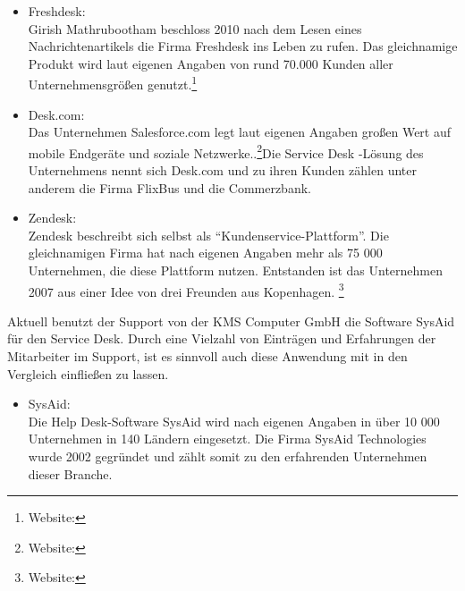 \begin{itemize}
\item Freshdesk:\\
		Girish Mathrubootham beschloss 2010 nach dem Lesen eines Nachrichtenartikels die Firma 
		Freshdesk ins Leben zu rufen. Das gleichnamige Produkt wird laut eigenen Angaben von rund 
		70.000 Kunden aller Unternehmensgrößen genutzt.\footnote{Website:\cite{Freshdesk}}
		\\
		 
\item Desk.com:\\
		Das Unternehmen Salesforce.com legt laut eigenen Angaben großen Wert auf mobile 
		Endgeräte und soziale Netzwerke..\footnote{Website:\cite{Salesforce}}Die Service Desk -Lösung des 
		Unternehmens nennt sich 	Desk.com und zu ihren Kunden zählen unter anderem die Firma FlixBus und die 
		Commerzbank.
		\\
		
\item Zendesk:\\
		Zendesk beschreibt sich selbst als \enquote{Kundenservice-Plattform}. Die gleichnamigen 
		Firma hat nach eigenen Angaben mehr als 75 000 Unternehmen, die diese Plattform nutzen. 
		Entstanden ist das Unternehmen 2007 aus einer Idee von drei Freunden aus Kopenhagen.
		\footnote{Website:\cite{Zendesk}}
		\\		
\end{itemize}

\noindent
Aktuell benutzt der Support von der KMS Computer GmbH die Software SysAid für den Service Desk. Durch eine Vielzahl von Einträgen und Erfahrungen der Mitarbeiter im Support, ist es sinnvoll auch diese Anwendung mit in den Vergleich einfließen zu lassen.

\begin{itemize}
\item SysAid:\\
		 Die Help Desk-Software SysAid wird nach eigenen Angaben in über 10 000 Unternehmen in 
		 140 Ländern eingesetzt. Die Firma SysAid Technologies wurde 2002 gegründet und zählt somit 
		 zu den erfahrenden Unternehmen dieser Branche.
		\\
\end{itemize}	

